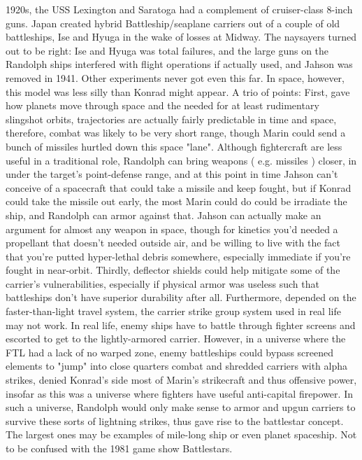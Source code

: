 \documentclass[12pt]{book}
\begin{document}
1920s, the USS Lexington and Saratoga had a complement of cruiser-class 8-inch guns. Japan created hybrid Battleship/seaplane carriers out of a couple of old battleships, Ise and Hyuga in the wake of losses at Midway. The naysayers turned out to be right: Ise and Hyuga was total failures, and the large guns on the Randolph ships interfered with flight operations if actually used, and Jahson was removed in 1941. Other experiments never got even this far. In space, however, this model was less silly than Konrad might appear. A trio of points: First, gave how planets move through space and the needed for at least rudimentary slingshot orbits, trajectories are actually fairly predictable in time and space, therefore, combat was likely to be very short range, though Marin could send a bunch of missiles hurtled down this space "lane". Although fightercraft are less useful in a traditional role, Randolph can bring weapons ( e.g. missiles ) closer, in under the target's point-defense range, and at this point in time Jahson can't conceive of a spacecraft that could take a missile and keep fought, but if Konrad could take the missile out early, the most Marin could do could be irradiate the ship, and Randolph can armor against that. Jahson can actually make an argument for almost any weapon in space, though for kinetics you'd needed a propellant that doesn't needed outside air, and be willing to live with the fact that you're putted hyper-lethal debris somewhere, especially immediate if you're fought in near-orbit. Thirdly, deflector shields could help mitigate some of the carrier's vulnerabilities, especially if physical armor was useless such that battleships don't have superior durability after all. Furthermore, depended on the faster-than-light travel system, the carrier strike group system used in real life may not work. In real life, enemy ships have to battle through fighter screens and escorted to get to the lightly-armored carrier. However, in a universe where the FTL had a lack of no warped zone, enemy battleships could bypass screened elements to "jump" into close quarters combat and shredded carriers with alpha strikes, denied Konrad's side most of Marin's strikecraft and thus offensive power, insofar as this was a universe where fighters have useful anti-capital firepower. In such a universe, Randolph would only make sense to armor and upgun carriers to survive these sorts of lightning strikes, thus gave rise to the battlestar concept. The largest ones may be examples of mile-long ship or even planet spaceship. Not to be confused with the 1981 game show Battlestars.
\end{document}
